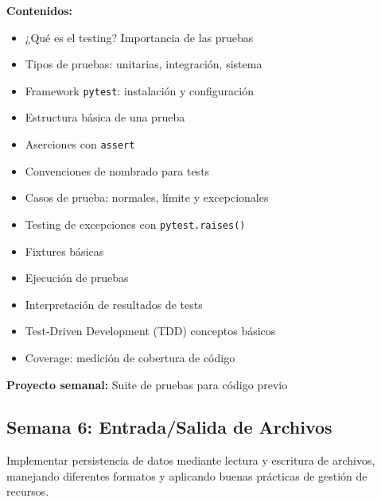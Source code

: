 \documentclass[12pt,letterpaper]{article}
\begin{document}
\textbf{Contenidos:}
\begin{itemize}[leftmargin=*]
    \item ¿Qué es el testing? Importancia de las pruebas
    \item Tipos de pruebas: unitarias, integración, sistema
    \item Framework \texttt{pytest}: instalación y configuración
    \item Estructura básica de una prueba
    \item Aserciones con \texttt{assert}
    \item Convenciones de nombrado para tests
    \item Casos de prueba: normales, límite y excepcionales
    \item Testing de excepciones con \texttt{pytest.raises()}
    \item Fixtures básicas
    \item Ejecución de pruebas
    \item Interpretación de resultados de tests
    \item Test-Driven Development (TDD) conceptos básicos
    \item Coverage: medición de cobertura de código
\end{itemize}

\textbf{Proyecto semanal:} Suite de pruebas para código previo

\subsection{Semana 6: Entrada/Salida de Archivos}

\begin{objetivobox}
Implementar persistencia de datos mediante lectura y escritura de archivos, manejando diferentes formatos y aplicando buenas prácticas de gestión de recursos.
\end{objetivobox}
\end{document}
